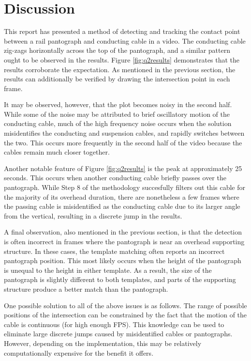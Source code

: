 \newpage
\section{Discussion}

This report has presented a method of detecting and tracking the contact point between a rail pantograph and conducting cable in a video. The conducting cable zig-zags horizontally across the top of the pantograph, and a similar pattern ought to be observed in the results. Figure \ref{fig:q2results} demonstrates that the results corroborate the expectation. As mentioned in the previous section, the results can additionally be verified by drawing the intersection point in each frame.

It may be observed, however, that the plot becomes noisy in the second half. While some of the noise may be attributed to brief oscillatory motion of the conducting cable, much of the high frequency noise occurs when the solution misidentifies the conducting and suspension cables, and rapidly switches between the two. This occurs more frequently in the second half of the video because the cables remain much closer together.

Another notable feature of Figure \ref{fig:q2results} is the peak at approximately 25 seconds. This occurs when another conducting cable briefly passes over the pantograph. While Step 8 of the methodology succesfully filters out this cable for the majority of its overhead duration, there are nonetheless a few frames where the passing cable is misidentified as the conducting cable due to its larger angle from the vertical, resulting in a discrete jump in the results.

A final observation, also mentioned in the previous section, is that the detection is often incorrect in frames where the pantograph is near an overhead supporting structure. In these cases, the template matching often reports an incorrect pantograph position. This most likely occurs when the height of the pantograph is unequal to the height in either template. As a result, the size of the pantograph is slightly different to both templates, and parts of the supporting structure produce a better match than the pantograph.

One possible solution to all of the above issues is as follows. The range of possible positions of the intersection can be constrained by the fact that the motion of the cable is continuous (for high enough FPS). This knowledge can be used to eliminate large discrete jumps caused by misidentified cables or pantographs. However, depending on the implementation, this may be relatively computationally expensive for the benefit it offers.

